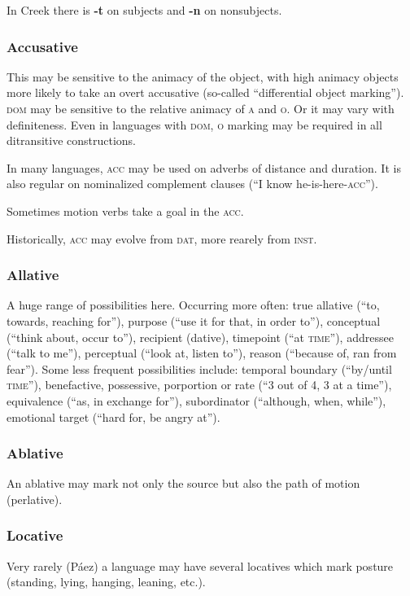 \documentclass[11pt]{article}
\newcommand{\LL}[1]{\textbf{#1}}  %
\newcommand{\I}[1]{\textsc{#1}}   %
\begin{document}
\noindent In Creek there is \LL{-t} on subjects and \LL{-n} on
nonsubjects. 

\subsubsection{Accusative} This may be sensitive to the animacy of the
object, with high animacy objects more likely to take an overt
accusative (so-called ``differential object marking'').  \I{dom} may
be sensitive to the relative animacy of \I{a} and \I{o}.  Or it may
vary with definiteness.  Even in languages with \I{dom}, \I{o} marking
may be required in all ditransitive constructions.

In many languages, \I{acc} may be used on adverbs of distance and
duration.  It is also regular on nominalized complement clauses (``I
know he-is-here-\I{acc}'').

Sometimes motion verbs take a goal in the \I{acc}.

Historically, \I{acc} may evolve from \I{dat}, more rearely from
\I{inst}. 


\subsubsection{Allative} A huge range of possibilities here.
Occurring more often: true allative (``to, towards, reaching for''),
purpose (``use it for that, in order to''), conceptual (``think about,
occur to''), recipient (dative), timepoint (``at \I{time}''),
addressee (``talk to me''), perceptual (``look at, listen to''),
reason (``because of, ran from fear'').  Some less frequent
possibilities include: temporal boundary (``by/until \I{time}''),
benefactive, possessive, porportion or rate (``3 out of 4, 3 at a
time''), equivalence (``as, in exchange for''), subordinator
(``although, when, while''), emotional target (``hard for, be angry
at'').

\subsubsection{Ablative} An ablative may mark not only the source but
also the path of motion (perlative).

\subsubsection{Locative} Very rarely (Páez) a language may have
several locatives which mark posture (standing, lying, hanging,
leaning, etc.).
\end{document}
